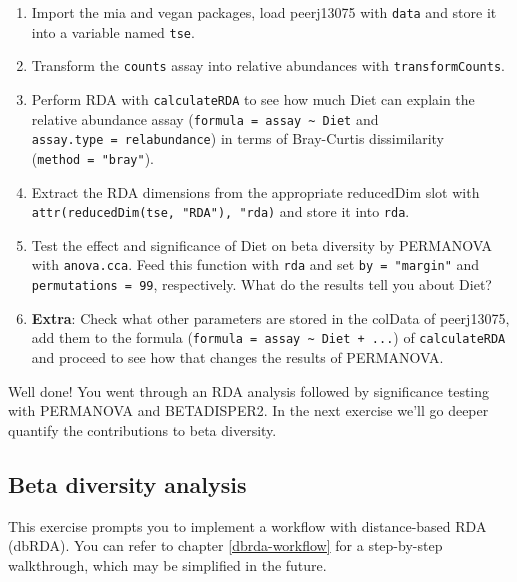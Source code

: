 \documentclass[
]{book}
\providecommand{\tightlist}{%
  \setlength{\itemsep}{0pt}\setlength{\parskip}{0pt}}
\begin{document}
\begin{enumerate}
\def\labelenumi{\arabic{enumi}.}
\tightlist
\item
  Import the mia and vegan packages, load peerj13075 with \texttt{data} and store it
  into a variable named \texttt{tse}.
\item
  Transform the \texttt{counts} assay into relative abundances with \texttt{transformCounts}.
\item
  Perform RDA with \texttt{calculateRDA} to see how much Diet can explain the relative
  abundance assay (\texttt{formula\ =\ assay\ \textasciitilde{}\ Diet} and \texttt{assay.type\ =\ relabundance}) in
  terms of Bray-Curtis dissimilarity (\texttt{method\ =\ "bray"}).
\item
  Extract the RDA dimensions from the appropriate reducedDim slot with
  \texttt{attr(reducedDim(tse,\ "RDA"),\ "rda)} and store it into \texttt{rda}.
\item
  Test the effect and significance of Diet on beta diversity by PERMANOVA with
  \texttt{anova.cca}. Feed this function with \texttt{rda} and set \texttt{by\ =\ "margin"} and
  \texttt{permutations\ =\ 99}, respectively. What do the results tell you about Diet?
\item
  \textbf{Extra}: Check what other parameters are stored in the colData of peerj13075,
  add them to the formula (\texttt{formula\ =\ assay\ \textasciitilde{}\ Diet\ +\ ...}) of \texttt{calculateRDA}
  and proceed to see how that changes the results of PERMANOVA.
\end{enumerate}

Well done! You went through an RDA analysis followed by significance testing
with PERMANOVA and BETADISPER2. In the next exercise we'll go deeper quantify
the contributions to beta diversity.

\hypertarget{beta-diversity-analysis}{%
\subsection{Beta diversity analysis}\label{beta-diversity-analysis}}

This exercise prompts you to implement a workflow with distance-based RDA
(dbRDA). You can refer to chapter \ref{dbrda-workflow} for a step-by-step
walkthrough, which may be simplified in the future.
\end{document}
